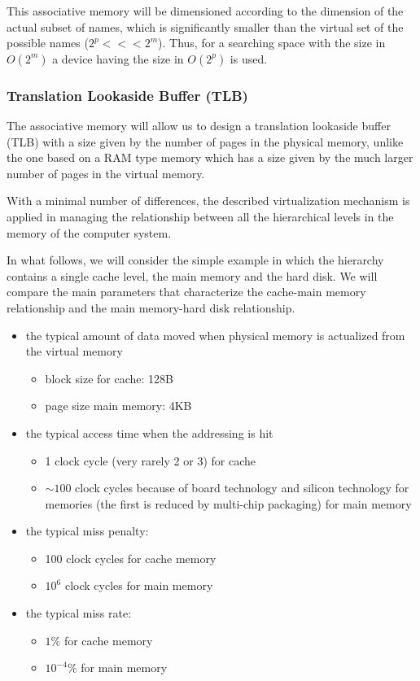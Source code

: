 This associative memory will be dimensioned according to the
dimension of the actual subset of names, which is significantly
smaller than the virtual set of the possible names ($2^{p} <<<
2^{m}$). Thus, for a searching space with the size in $O(2^{m})$ a
device having the size in $O(2^{p})$ is used.


\subsubsection{Translation Lookaside Buffer (TLB)}

The associative memory will allow us to design a translation lookaside buffer (TLB) with a size given by the number of pages in the physical memory, unlike the one based on a RAM type memory which has a size given by the much larger number of pages in the virtual memory.

With a minimal number of differences, the described virtualization mechanism is applied in managing the relationship between all the hierarchical levels in the memory of the computer system.

In what follows, we will consider the simple example in which the hierarchy contains a single cache level, the main memory and the hard disk. We will compare the main parameters that characterize the  cache-main memory relationship and the main memory-hard disk relationship.
\begin{itemize}
    \item the typical amount of data moved when physical memory is actualized from the virtual memory
        \begin{itemize}
            \item block size for cache: 128B
            \item page size main memory: 4KB
        \end{itemize}
    \item the typical access time when the addressing is hit
        \begin{itemize}
            \item 1 clock cycle (very rarely 2 or 3) for cache
            \item $\sim 100$ clock cycles because of board technology and silicon technology for memories (the first is reduced by multi-chip packaging) for main memory
        \end{itemize}
    \item the typical miss penalty:
        \begin{itemize}
            \item 100 clock cycles for cache memory
            \item $10^6$ clock cycles for main memory
        \end{itemize}
    \item the typical miss rate:
        \begin{itemize}
            \item $1\%$ for cache memory
            \item $10^{-4}\%$ for main memory
        \end{itemize}
\end{itemize}

